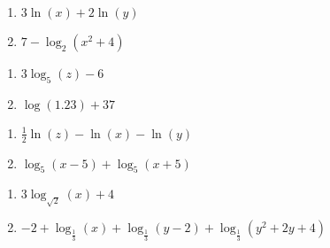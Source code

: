 \documentclass{ximera}
\begin{document}
	\author{Stitz-Zeager}



\label{AnswersforPropertiesofLogarithms}

\begin{multicols}{2}
\begin{enumerate}

\item $3\ln(x) + 2\ln(y)$
\item $7 - \log_{2}(x^{2} + 4)$

\setcounter{HW}{\value{enumi}}
\end{enumerate}
\end{multicols}

\begin{multicols}{2}
\begin{enumerate}
\setcounter{enumi}{\value{HW}}


\item $3\log_{5}(z) - 6$
\item $\log(1.23) + 37$

\setcounter{HW}{\value{enumi}}
\end{enumerate}
\end{multicols}

\begin{multicols}{2}
\begin{enumerate}
\setcounter{enumi}{\value{HW}}

\item $\frac{1}{2}\ln(z) - \ln(x) - \ln(y)$
\item  $\log_{5}(x-5) + \log_{5}(x+5)$

\setcounter{HW}{\value{enumi}}
\end{enumerate}
\end{multicols}

\begin{multicols}{2}
\begin{enumerate}
\setcounter{enumi}{\value{HW}}

\item  $3\log_{\sqrt{2}}(x) + 4$
\item \small$-2 + \log_{\frac{1}{3}}(x) + \log_{\frac{1}{3}}(y - 2) + \log_{\frac{1}{3}}(y^{2} + 2y + 4)$\normalsize

\setcounter{HW}{\value{enumi}}
\end{enumerate}
\end{multicols}
\end{document}
